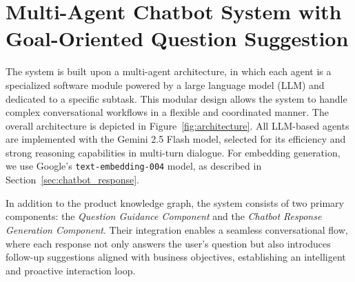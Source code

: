 \section{Multi-Agent Chatbot System with Goal-Oriented Question Suggestion}
\label{sec:multi_agent_architecture}




The system is built upon a multi-agent architecture, in which each agent is a specialized software module powered by a large language model (LLM) and dedicated to a specific subtask. This modular design allows the system to handle complex conversational workflows in a flexible and coordinated manner. The overall architecture is depicted in Figure~\ref{fig:architecture}. All LLM-based agents are implemented with the Gemini 2.5 Flash model, selected for its efficiency and strong reasoning capabilities in multi-turn dialogue. For embedding generation, we use Google’s \texttt{text-embedding-004} model, as described in Section~\ref{sec:chatbot_response}.

In addition to the product knowledge graph, the system consists of two primary components: the \textit{Question Guidance Component} and the \textit{Chatbot Response Generation Component}. Their integration enables a seamless conversational flow, where each response not only answers the user's question but also introduces follow-up suggestions aligned with business objectives, establishing an intelligent and proactive interaction loop.

